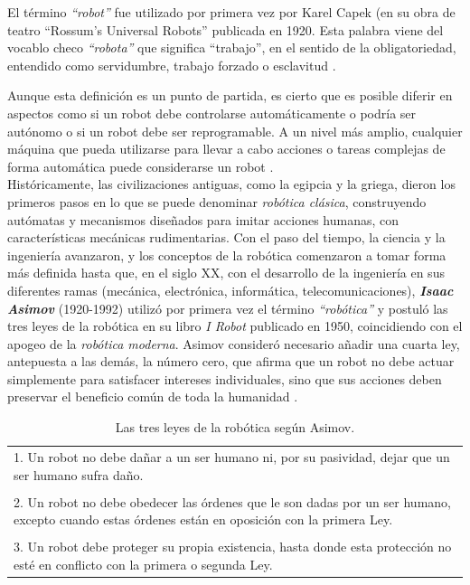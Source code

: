 El término \textit{“robot”} fue utilizado por primera vez por Karel Capek (en su obra de teatro “Rossum’s Universal Robots” publicada en 1920. Esta palabra viene del vocablo checo \textit{“robota”} que significa “trabajo”, en el sentido de la obligatoriedad, entendido como servidumbre, trabajo forzado o esclavitud \cite{Sanchez07a}.

Aunque esta definición es un punto de partida, es cierto que es posible diferir en aspectos como si un robot debe controlarse automáticamente o podría ser autónomo o si un robot debe ser reprogramable. A un nivel más amplio, cualquier máquina que pueda utilizarse para llevar a cabo acciones o tareas complejas de forma automática puede considerarse un robot \cite{Raj19}.\\

Históricamente, las civilizaciones antiguas, como la egipcia y la griega, dieron los primeros pasos en lo que se puede denominar \textit{robótica clásica}, construyendo autómatas y mecanismos diseñados para imitar acciones humanas, con características mecánicas rudimentarias. 
Con el paso del tiempo, la ciencia y la ingeniería avanzaron, y los conceptos de la robótica comenzaron a tomar forma más definida hasta que, en el siglo XX, con el desarrollo de la ingeniería en sus diferentes ramas (mecánica, electrónica, informática, telecomunicaciones), \textbf{\emph{Isaac Asimov}} (1920-1992) utilizó por primera vez el término \textit{“robótica”} y postuló las tres leyes de la robótica en su libro \textit{I Robot} publicado en 1950, coincidiendo con el apogeo de la \textit{robótica moderna}. Asimov consideró necesario añadir una cuarta ley, antepuesta a las demás, la número cero, que afirma que un robot no debe actuar simplemente para satisfacer intereses individuales, sino que sus acciones deben preservar el beneficio común de toda la humanidad \cite{Sanchez07b}.

\pagebreak

\begin{table} [h!]
  \begin{center}
    \begin{tabular}{p{15cm}} %
      \hline
      1. Un robot no debe dañar a un ser humano ni, por su pasividad, dejar que un ser humano sufra daño.\\\\
    
      2. Un robot no debe obedecer las órdenes que le son dadas por un ser humano, excepto cuando estas órdenes están en oposición con la primera Ley.\\\\
    
      3. Un robot debe proteger su propia existencia, hasta donde esta protección no esté en conflicto con la primera o segunda Ley. \\
      \hline
    \end{tabular}
  \end{center}
  \caption{Las tres leyes de la robótica según Asimov.}
  \label{cuadro:leyesrobotica_Asimov}
\end{table}

